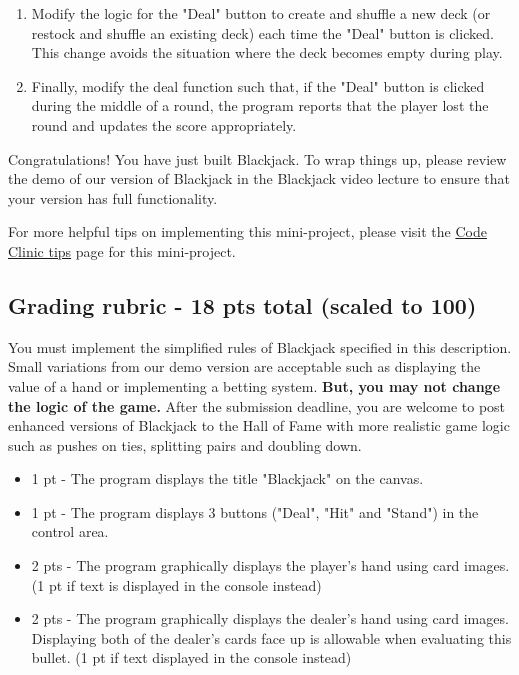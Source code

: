 \documentclass[a4paper,14pt]{article}
\begin{document}
\begin{CJK}{UTF8}{gkai}
\begin{enumerate}
\item \noindent Modify the logic for the "Deal" button to create and shuffle a new deck (or restock and shuffle an existing deck) each time the "Deal" button is clicked. This change avoids the situation where the deck becomes empty during play.

\item \noindent Finally, modify the deal function such that, if the "Deal" button is clicked during the middle of a round, the program reports that the player lost the round and updates the score appropriately.


\end{enumerate}
\noindent Congratulations! You have just built Blackjack. To wrap things up, please review the demo of our version of Blackjack in the Blackjack video lecture to ensure that your version has full functionality.


\noindent For more helpful tips on implementing this mini-project, please visit the \href{https://class.coursera.org/interactivepython2-010/wiki/blackjack_tips}{Code Clinic tips} page for this mini-project.

\subsection*{Grading rubric - 18 pts total (scaled to 100)}

\noindent You must implement the simplified rules of Blackjack specified in this description. Small variations from our demo version are acceptable such as displaying the value of a hand or implementing a betting system. \textbf{But, you may not change the logic of the game.} After the submission deadline, you are welcome to post enhanced versions of Blackjack to the Hall of Fame with more realistic game logic such as pushes on ties, splitting pairs and doubling down.

\begin{itemize}

\item 1 pt - The program displays the title "Blackjack" on the canvas.

\item 1 pt - The program displays 3 buttons ("Deal", "Hit" and "Stand") in the control area.

\item 2 pts - The program graphically displays the player's hand using card images. (1 pt if text is displayed in the console instead)

\item 2 pts - The program graphically displays the dealer's hand using card images. Displaying both of the dealer's cards face up is allowable when evaluating this bullet. (1 pt if text displayed in the console instead)


\end{itemize}
\end{CJK}
\end{document}
